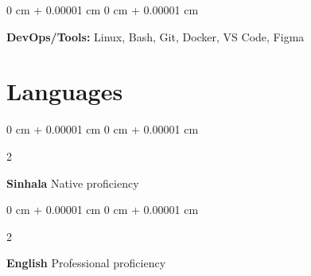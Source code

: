 \documentclass[10pt, letterpaper]{article}
\newenvironment{onecolentry}{
    \begin{adjustwidth}{
        0 cm + 0.00001 cm
    }{
        0 cm + 0.00001 cm
    }
}{
    \end{adjustwidth}
} %
\newenvironment{twocolentry}[2][]{
    \onecolentry
    \def\secondColumn{#2}
    \setcolumnwidth{\fill, 4.5 cm}
    \begin{paracol}{2}
}{
    \switchcolumn \raggedleft \secondColumn
    \end{paracol}
    \endonecolentry
} %
\begin{document}
        \vspace{0.2 cm}

        \begin{onecolentry}
            \textbf{DevOps/Tools:} Linux, Bash, Git, Docker, VS Code, Figma
        \end{onecolentry}
    
    \section{Languages}

        \begin{twocolentry}{
            Native proficiency
        }
            \textbf{Sinhala}\end{twocolentry}

        \vspace{0.30 cm}
        \begin{twocolentry}{
            Professional proficiency
        }
            \textbf{English}\end{twocolentry}
\end{document}
